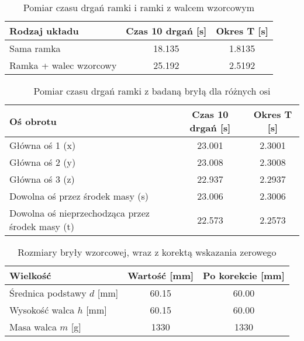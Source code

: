 \documentclass[a4paper,12pt]{article}
\begin{document}
\begin{table}[H]
    \centering
    \begin{tabular}{|l|c|c|}
        \hline
        \textbf{Rodzaj układu} & \textbf{Czas 10 drgań [s]} & \textbf{Okres T [s]} \\
        \hline
        Sama ramka & 18.135 & 1.8135 \\
        \hline
        Ramka + walec wzorcowy & 25.192 & 2.5192 \\
        \hline
    \end{tabular}
    \caption{Pomiar czasu drgań ramki i ramki z walcem wzorcowym}
    \label{tab:pomiar_czasu_drgan_ramki_z_walcem}
\end{table}

\begin{table}[H]
    \centering
    \begin{tabular}{|l|c|c|}
        \hline
        \textbf{Oś obrotu} & \textbf{Czas 10 drgań [s]} & \textbf{Okres T [s]} \\
        \hline
        Główna oś 1 (x) & 23.001 & 2.3001 \\
        \hline
        Główna oś 2 (y) & 23.008 & 2.3008 \\
        \hline
        Główna oś 3 (z) & 22.937 & 2.2937 \\
        \hline
        Dowolna oś przez środek masy (s) & 23.006 & 2.3006 \\
        \hline
        Dowolna oś nieprzechodząca przez środek masy (t) & 22.573 & 2.2573 \\
        \hline
    \end{tabular}
    \caption{Pomiar czasu drgań ramki z badaną bryłą dla różnych osi}
    \label{tab:pomiar_czasu_drgan_badanej_bryly}
\end{table}

\begin{table}[H]
    \centering
    \begin{tabular}{|l|c|c|}
        \hline
        \textbf{Wielkość} & \textbf{Wartość [mm]} & \textbf{Po korekcie [mm]} \\
        \hline
        Średnica podstawy $d$ [mm] & 60.15 & 60.00 \\
        \hline
        Wysokość walca $h$ [mm] & 60.15 & 60.00\\
        \hline
        Masa walca $m$ [g] & 1330 & 1330 \\
        \hline
    \end{tabular}
    \caption{Rozmiary bryły wzorcowej, wraz z korektą wskazania zerowego}
    \label{tab:rozmiar_bryly_wzorcowej}
\end{table}
\end{document}
